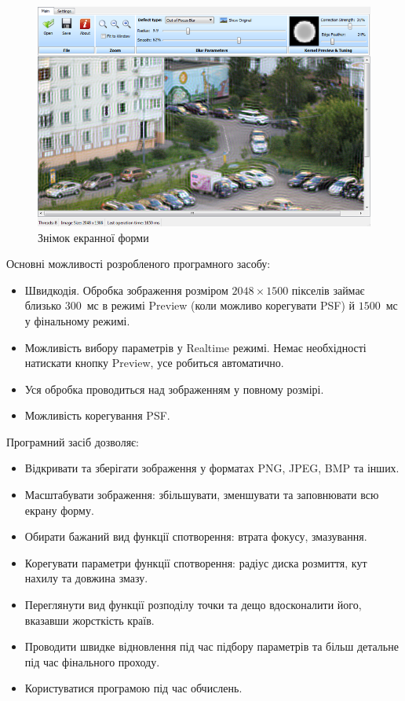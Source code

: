 \documentclass{diploma}
\begin{document}
  \begin{figure}[h]
    \centering
    \includegraphics[width=\linewidth]{gui.png}
    \caption{Знімок екранної форми}
    \label{fig:gui}
  \end{figure}

  Основні можливості розробленого програмного засобу:
  \begin{itemize}
    \item Швидкодія.
      Обробка зображення розміром $2048\times1500$ пікселів займає близько
      $300$~мс в режимі Preview (коли можливо корегувати PSF) й $1500$~мс у
      фінальному режимі.
    \item Можливість вибору параметрів у Realtime режимі.
      Немає необхідності натискати кнопку Preview, усе робиться автоматично.
    \item Уся обробка проводиться над зображенням у повному розмірі.
    \item Можливість корегування PSF.
  \end{itemize}

  Програмний засіб дозволяє:
  \begin{itemize}
    \item Відкривати та зберігати зображення у форматах PNG, JPEG, BMP та
      інших.
    \item Масштабувати зображення: збільшувати, зменшувати та заповнювати всю
      екрану форму.
    \item Обирати бажаний вид функції спотворення: втрата фокусу, змазування.
    \item Корегувати параметри функції спотворення: радіус диска розмиття, кут
      нахилу та довжина змазу.
    \item Переглянути вид функції розподілу точки та дещо вдосконалити його,
      вказавши жорсткість країв.
    \item Проводити швидке відновлення під час підбору параметрів та більш
      детальне під час фінального проходу.
    \item Користуватися програмою під час обчислень.
  \end{itemize}
\end{document}
